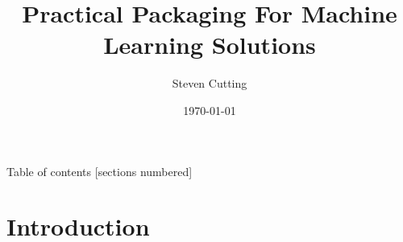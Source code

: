 \documentclass[10pt]{beamer}
\title{Practical Packaging For Machine Learning Solutions}
\date{\today}
\author{Steven Cutting}
\begin{document}
\maketitle



\begin{frame}{Table of contents}
  [sections numbered]
  \tableofcontents[hideallsubsections]
\end{frame}







\section{Introduction}



  
\end{document}
